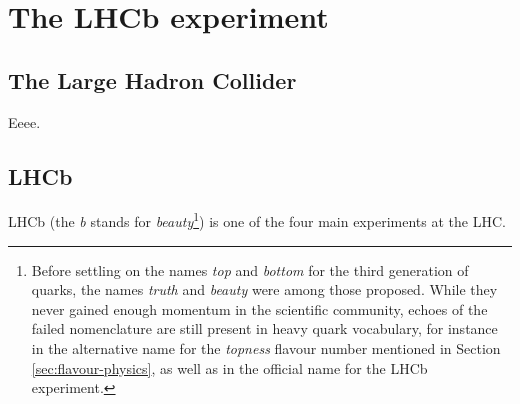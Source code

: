 \chapter{The LHCb experiment}

\section{The Large Hadron Collider}
Eeee.

\section{LHCb}
LHCb (the \textit{b} stands for \textit{beauty}\footnote{Before settling on the names \textit{top} and \textit{bottom} for the third generation of quarks, the names \textit{truth} and \textit{beauty} were among those proposed. While they never gained enough momentum in the scientific community, echoes of the failed nomenclature are still present in heavy quark vocabulary, for instance in the alternative name for the \textit{topness} flavour number mentioned in Section \ref{sec:flavour-physics}, as well as in the official name for the LHCb experiment.}) is one of the four main experiments at the LHC.
